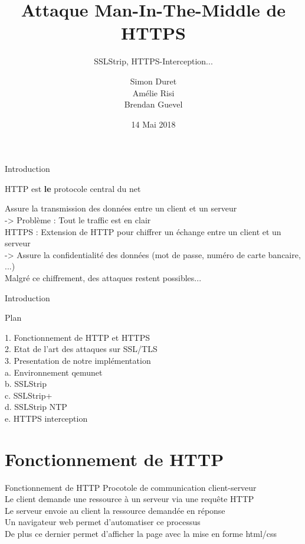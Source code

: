 \documentclass{beamer}
\title[Attaques sur HTTPS]{Attaque Man-In-The-Middle de HTTPS}
\subtitle{SSLStrip, HTTPS-Interception...}
\author[S. Duret - A. Risi - B. Guevel]{Simon Duret\\Amélie Risi\\Brendan Guevel}
\institute[]{Université de Bordeaux}
\date{14 Mai 2018}
\begin{document}
\begin{frame}
	\titlepage
\end{frame}

\begin{frame}{Introduction}
    {\Large \centerline{HTTP est \textbf{le} protocole central du net}}

    Assure la transmission des données entre un client et un serveur \\
    -> Problème : Tout le traffic est en clair \\
    HTTPS : Extension de HTTP pour chiffrer un échange entre un client et un serveur \\
    -> Assure la confidentialité des données (mot de passe, numéro de carte bancaire, ...) \\

    Malgré ce chiffrement, des attaques restent possibles...

\end{frame}

\begin{frame}{Introduction}
    {\Large \centerline{Plan}}

    1. Fonctionnement de HTTP et HTTPS \\
    2. Etat de l'art des attaques sur SSL/TLS \\
    3. Presentation de notre implémentation \\
        a. Environnement qemunet \\
        b. SSLStrip \\
        c. SSLStrip+ \\
        d. SSLStrip NTP \\
        e. HTTPS interception \\

\end{frame}

\section{Fonctionnement de HTTP}

\begin{frame}{Fonctionnement de HTTP}
    Procotole de communication client-serveur \\
    Le client demande une ressource à un serveur via une requête HTTP \\
    Le serveur envoie au client la ressource demandée en réponse \\
    Un navigateur web permet d'automatiser ce processus \\
    De plus ce dernier permet d'afficher la page avec la mise en forme html/css

\end{frame}
\end{document}
